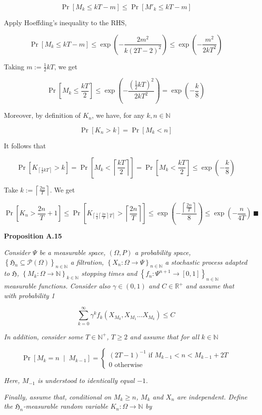 \documentclass[a4paper]{article}
\newcommand{\Co}[1]{}
\newcommand{\AP}[1]{\left(#1\right)}
\newcommand{\AB}[1]{\left[#1\right]}
\newcommand{\AC}[1]{\left\{#1\right\}}
\newcommand{\ABM}[2]{\left[#1\;\middle\vert\;#2\right]}
\newcommand{\Ceil}[1]{\left\lceil #1 \right\rceil}
\newcommand{\Pa}[2]{\underset{#1}{\operatorname{Pr}}\AB{#2}}
\newcommand{\CP}[3]{\underset{#1}{\operatorname{Pr}}\ABM{#2}{#3}}
\newcommand{\Nats}{\mathbb{N}}
\newcommand{\Reals}{\mathbb{R}}
\newcommand{\PS}[1]{\mathcal{P}\AP{#1}} %
\newcommand{\Fi}{\mathfrak{H}}
\begin{document}
$$\Pa{}{M_k\leq kT-m}\leq\Pa{}{M'_k\leq kT-m}$$

Apply Hoeffding's inequality to the RHS,

$$\Pa{}{M_k\leq kT-m}\leq\exp\AP{-\frac{2m^2}{k(2T-2)^2}}\leq\exp\AP{-\frac{m^2}{2kT^2}}$$

Taking $m:=\frac{1}{2}kT$, we get

$$\Pa{}{M_k\leq \frac{kT}{2}}\leq\exp\AP{-\frac{\AP{\frac{1}{2}kT}^2}{2kT^2}}=\exp\AP{-\frac{k}{8}}$$

Moreover, by definition of $K_n$, we have, for any $k,n\in\Nats$

$$\Pa{}{K_n> k}=\Pa{}{M_k< n}$$

It follows that

$$\Pa{}{K_{\Ceil{\frac{1}{2}kT}}>k}=\Pa{}{M_k< \Ceil{\frac{kT}{2}}}=\Pa{}{M_k<\frac{kT}{2}}\leq\exp\AP{-\frac{k}{8}}$$

Take $k:=\Ceil{\frac{2n}{T}}$. We get

$$\Pa{}{K_n>\frac{2n}{T}+1}\leq\Pa{}{K_{\Ceil{\frac{1}{2}\Ceil{\frac{2n}{T}}T}}>\Ceil{\frac{2n}{T}}}\leq\exp\AP{-\frac{\Ceil{\frac{2n}{T}}}{8}}\leq\exp\AP{-\frac{n}{4T}}\ \blacksquare$$

\textbf{Proposition A.15}\Co{b}

\textit{Consider $\Psi$ be a measurable space, $(\Omega,P)$ a probability space, $\AC{\Fi_n\subseteq\PS{\Omega}}_{n\in\Nats}$ a filtration, $\AC{X_n:\Omega\rightarrow\Psi}_{n\in\Nats}$ a stochastic process adapted to $\Fi$, $\AC{M_k:\Omega\rightarrow\Nats}_{k\in\Nats}$ stopping times and $\AC{f_n:\Psi^{n+1}\rightarrow[0,1]}_{n\in\Nats}$ measurable functions. Consider also $\gamma\in(0,1)$ and $C\in\Reals^+$ and assume that with probability 1}\Co{i}

$$\sum_{k=0}^\infty \gamma^kf_k\AP{X_{M_0},X_{M_1}\ldots X_{M_{k}}} \leq C$$

\textit{In addition, consider some $T\in\Nats^+$, $T\geq2$ and assume that for all $k\in\Nats$}\Co{i}

$$\CP{}{M_{k}=n}{M_{k-1}}=\begin{cases} \AP{2T-1}^{-1} \text{ if } M_{k-1} < n < M_{k-1}+2T\\ 0 \text{ otherwise} \end{cases}$$

\textit{Here, $M_{-1}$ is understood to identically equal $-1$.}\Co{i}

\textit{Finally, assume that, conditional on $M_k\geq n$, $M_k$ and $X_{n}$ are independent. Define the $\Fi_n$-measurable random variable $K_n:\Omega\rightarrow\Nats$ by}\Co{i}
\end{document}
